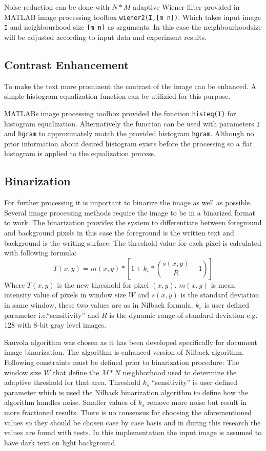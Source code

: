 \documentclass{article}
\def\code#1{\texttt{#1}}
\begin{document}
          Noise reduction can be done with $N * M$ adaptive Wiener filter provided in MATLAB image processing toolbox \code{wiener2(I,[m n])}. Which takes input image \code{I} and neighbourhood size \code{[m n]} as arguments. In this case the neighbourhoodsize will be adjusted according to input data and experiment results.

        \subsection{Contrast Enhancement}
          To make the text more prominent the contrast of the image can be enhanced. A simple histogram equalization function can be utilizied for this purpose.

          MATLABs image processing toolbox provided the function \code{histeq(I)} for histogram equalization. Alternatively the function can be used with parameters \code{I} and \code{hgram} to approximately match the provided histogram \code{hgram}. Although no prior information about desired histogram exists before the processing so a flat histogram is applied to the equalization process.

        \subsection{Binarization}
          For further processing it is important to binarize the image as well as possible. Several image processing methods require the image to be in a binarized format to work. The binarization provides the system to differentiate between foreground and background pixels in this case the foreground is the written text and background is the writing surface. The threshold value for each pixel is calculated with following formula:
          \begin{equation}
            T(x,y) = m(x,y)*\left[1+k_s*\left(\frac{s(x,y)}{R}-1\right)\right]
          \end{equation}
          Where $T(x,y)$ is the new threshold for pixel $(x,y)$. $m(x,y)$ is mean intensity value of pixels in window size $W$ and $s(x,y)$ is the standard deviation in same window, these two values are as in Nilback formula. $k_s$ is user defined parameter i.e.``sensitivity'' and  $R$ is the dynamic range of standard deviation e.g. 128 with 8-bit gray level images.

          Sauvola algorithm was chosen as it has been developed specifically for document image binarization. The algorithm is enhanced version of Nilback algorithm. \cite{Sauvola2000} Following constraints must be defined prior to binarization procedure: The window size $W$ that define the $M * N$ neighborhood used to determine the adaptive threshold for that area. Threshold $k_s$ ``sensitivity'' is user defined parameter which is used the Nilback binarization algorithm to define how the algorithm handles noise. Smaller values of $k_s$ remove more noise but result in more fractioned results. There is no consensus for choosing the aforementioned values so they should be chosen case by case basis and in during this research the values are found with tests. In this implementation the input image is assumed to have dark text on light background.
\end{document}
